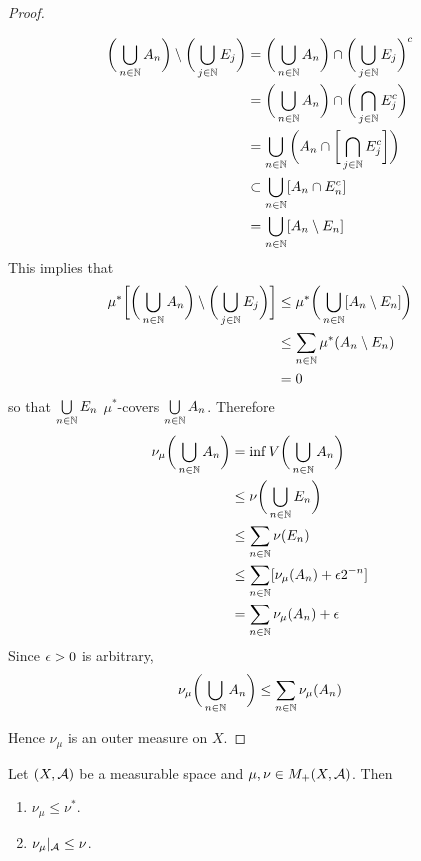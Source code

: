 \documentclass{book}
\begin{document}
\begin{proof}
\begin{enumerate}
			\begin{align*}
				\bigg( \bigcup_{n \in \mathbb{N}} A_n \bigg)  \setminus  \bigg( \bigcup_{j \in \mathbb{N}} E_j \bigg)
				& =  \bigg( \bigcup_{n \in \mathbb{N}} A_n \bigg) \cap 	\bigg( \bigcup_{j \in \mathbb{N}} E_j \bigg)^c \\
				& =  \bigg( \bigcup_{n \in \mathbb{N}} A_n \bigg) \cap 	\bigg( \bigcap_{j \in \mathbb{N}} E_j^c \bigg) \\
				& =  \bigcup_{n \in \mathbb{N}}  \bigg( A_n  \cap \bigg[ \bigcap_{j \in \mathbb{N}} E_j^c \bigg] \bigg) \\
				& \subset \bigcup_{n \in \mathbb{N}}  [ A_n  \cap E_n^c ] \\
				& = \bigcup_{n \in \mathbb{N}}  [ A_n  \setminus E_n ] \\
			\end{align*}
			This implies that 
			\begin{align*}
				\mu^* \bigg[ \bigg( \bigcup_{n \in \mathbb{N}} A_n \bigg)  \setminus  \bigg( \bigcup_{j \in \mathbb{N}} E_j \bigg) \bigg]
				& \leq \mu^* \bigg( \bigcup_{n \in \mathbb{N}}  [ A_n  \setminus E_n ] \bigg)  \\ 
				& \leq \sum\limits_{n \in \mathbb{N}} \mu^*(A_n \setminus E_n) \\
				& = 0
			\end{align*}
			so that $ \bigcup\limits_{n \in \mathbb{N}} E_n$ $\mu^*$-covers $\bigcup\limits_{n \in \mathbb{N}} A_n$. Therefore 
			\begin{align*}
				\nu_{\mu} \bigg( \bigcup_{n \in \mathbb{N}} A_n \bigg) 
				& = \inf V \bigg( \bigcup_{n \in \mathbb{N}} A_n \bigg) \\  
				& \leq \nu \bigg( \bigcup_{n \in \mathbb{N}} E_n \bigg) \\
				& \leq \sum\limits_{n \in \mathbb{N}} \nu(E_n) \\
				& \leq \sum\limits_{n \in \mathbb{N}} [\nu_{\mu}(A_n) + \epsilon 2^{-n}] \\
				& = \sum\limits_{n \in \mathbb{N}} \nu_{\mu}(A_n) + \epsilon 
			\end{align*}
			Since $\epsilon >0$ is arbitrary, 
			$$ \nu_{\mu} \bigg( \bigcup_{n \in \mathbb{N}} A_n \bigg)  \leq \sum\limits_{n \in \mathbb{N}} \nu_{\mu}(A_n) $$
		\end{enumerate} 
		Hence $\nu_{\mu}$ is an outer measure on $X$.
	\end{proof}

	\begin{ex}   
		Let $(X, \mathcal{A})$ be a measurable space and $\mu, \nu \in M_+(X, \mathcal{A})$. Then 
		\begin{enumerate}
			\item $\nu_{\mu} \leq \nu^*$.
			\item $\nu_{\mu}|_{\mathcal{A}} \leq \nu$.
		\end{enumerate}
	\end{ex}
\end{document}
